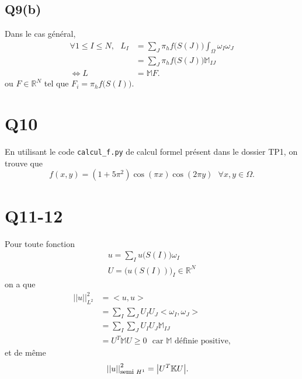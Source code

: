\documentclass[11pt]{article}
\newcommand{\smbox}[1]{\mbox{\footnotesize #1}}
\newcommand{\R}{\mathbb{R}}
\newcommand{\K}{\mathbb{K}}
\newcommand{\M}{\mathbb{M}}
\newcommand{\ms}{~~~}
\newcommand{\norm}[1]{\left|\left|#1\right|\right|}
\begin{document}
\subsection{Q9(b)}

Dans le cas général,
\begin{align}
  \forall 1 \leq I \leq N, \ms L_I
  &= \sum_J \pi_h f\big(S(J)\big) \int_\Omega \omega_I \omega_J \\
  &= \sum_J \pi_h f\big(S(J)\big) \M_{IJ} \\
  \Leftrightarrow
  L &= \M F.
\end{align}
ou $F\in\R^{ N}$ tel que $F_i = \pi_h f\big(S(I)\big)$.

\section{Q10}

En utilisant le code \texttt{calcul\_f.py} de calcul formel présent dans le dossier TP1, on trouve que
\begin{equation}
  f(x,y) = (1+5\pi^2)\cos(\pi x)\cos(2\pi y) \ms \forall x,y\in\Omega.
\end{equation}

\section{Q11-12}

Pour toute fonction
\begin{align}
  u = \sum_I u\big(S(I)\big) \omega_I \\
  U = \big(u(S(I))\big)_I \in \R^{ N}
\end{align}
on a que
\begin{align}
  \norm{u}_{L^2}^2 &= \big<u, u\big> \\
                   &= \sum_I \sum_J U_I U_J \big< \omega_I, \omega_J\big> \\
                   &= \sum_I \sum_J U_I U_J \M_{IJ} \\
                   &= U^T \M U \geq 0 \ms \mbox{car $\M$ définie positive,}
\end{align}
et de même
\begin{align}
  \norm{u}_{\smbox{semi~} H^1}^2 &= \big|U^T \K U \big|.
\end{align}
\end{document}
